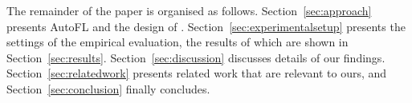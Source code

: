 The remainder of the paper is organised as follows. Section~\ref{sec:approach} presents AutoFL and the design of \name. Section~\ref{sec:experimentalsetup} presents the settings of the empirical evaluation, the results of which are shown in Section~\ref{sec:results}. Section~\ref{sec:discussion} discusses details of our findings. Section~\ref{sec:relatedwork} presents related work that are relevant to ours, and Section~\ref{sec:conclusion} finally concludes.